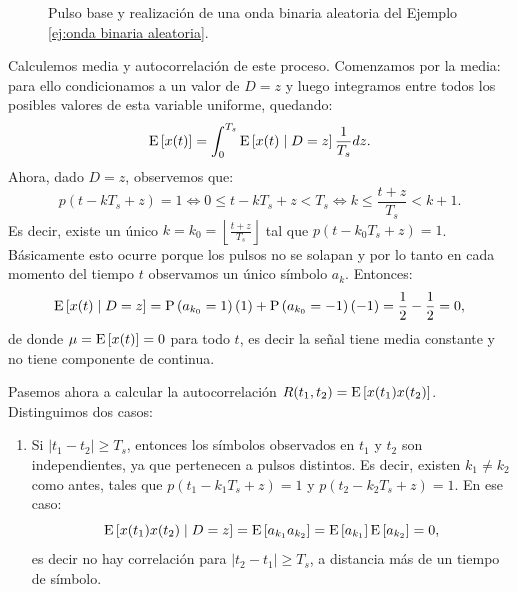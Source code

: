 \begin{ejemplo}
\begin{figure}
\begin{center}
        \end{center}
        \caption{Pulso base y realización de una onda binaria aleatoria del Ejemplo \ref{ej:onda binaria aleatoria}.}\label{fig:onda binaria aleatoria}
    \end{figure}

    Calculemos media y autocorrelación de este proceso. Comenzamos por la media: para ello condicionamos a un valor de $D=z$ y luego integramos entre todos los posibles valores de esta variable uniforme, quedando:
    \begin{equation*}
        \mathrm{E}\left[x(t)\right] = \int_0^{T_s} \mathrm{E}\left[x(t)\mid D=z\right] \frac{1}{T_s} dz.
    \end{equation*}
    Ahora, dado $D=z$, observemos que:
    \begin{equation*}
        p(t-kT_s + z) = 1 \iff 0\leqslant t-kT_s +z < T_s \iff k\leqslant \frac{t + z}{T_s} < k+1.
    \end{equation*}
    Es decir, existe un único $k=k_0 = \left\lfloor \frac{t+z}{T_s}\right\rfloor$ tal que $p(t-k_0T_s + z) = 1$. Básicamente esto ocurre porque los pulsos no se solapan y por lo tanto en cada momento del tiempo $t$ observamos un único símbolo $a_k$. Entonces:
    \begin{equation*}
        \mathrm{E}\left[x(t)\mid D =  z\right] = \mathrm{P}\left(a_{k_0} = 1\right) (1) + \mathrm{P}\left(a_{k_0} = -1\right) (-1) = \frac{1}{2}-\frac{1}{2} = 0, 
    \end{equation*}
    de donde $\mu = \mathrm{E}\left[x(t)\right] = 0$ para todo $t$, es decir la señal tiene media constante y no tiene componente de continua.

    Pasemos ahora a calcular la autocorrelación $R(t_1,t_2) = \mathrm{E}\left[x(t_1)x(t_2)\right]$.    Distinguimos dos casos:
    \begin{enumerate}
        \item Si $|t_1-t_2|\geqslant T_s$, entonces los símbolos observados en $t_1$ y $t_2$ son independientes, ya que pertenecen a pulsos distintos. Es decir, existen $k_1\neq k_2$ como antes, tales que $p(t_1-k_1T_s+z) = 1$ y $p(t_2-k_2T_s+z) = 1$. En ese caso:
        \begin{equation*}
          \mathrm{E}\left[x(t_1)x(t_2)\mid D=z\right] = \mathrm{E}\left[a_{k_1}a_{k_2}\right] = \mathrm{E}\left[a_{k_1}\right]\mathrm{E}\left[a_{k_2}\right] = 0,  
        \end{equation*}
        es decir no hay correlación para $|t_2-t_1|\geqslant T_s$, a distancia más de un tiempo de símbolo.


\end{enumerate}
\end{ejemplo}
